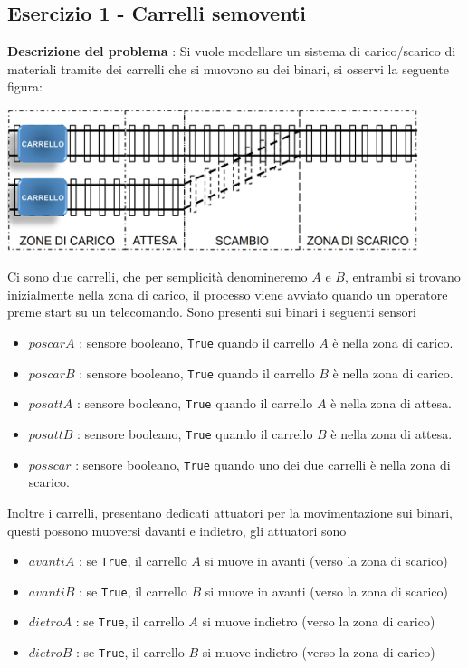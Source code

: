 \documentclass[10pt, letterpaper]{report}
\begin{document}
\subsection{Esercizio 1 - Carrelli semoventi}
\textbf{Descrizione del problema} : Si vuole modellare un sistema di carico/scarico di materiali tramite dei carrelli che si muovono su dei binari, si osservi la seguente figura:
\begin{center}
    \includegraphics[width=0.9\textwidth ]{images/carrelli.png}
\end{center}
Ci sono due carrelli, che per semplicità denomineremo $A$ e $B$, entrambi si trovano inizialmente nella zona di carico, il processo viene avviato quando un operatore preme start su un telecomando. Sono presenti sui binari i seguenti sensori\begin{itemize}
    \item \color{darkgreen}$poscarA$\color{black} : sensore booleano, \texttt{True} quando il carrello $A$ è nella zona di carico.
    \item \color{darkgreen}$poscarB$\color{black} : sensore booleano, \texttt{True} quando il carrello $B$ è nella zona di carico.
    \item \color{darkgreen}$posattA$\color{black} : sensore booleano, \texttt{True} quando il carrello $A$ è nella zona di attesa.
    \item \color{darkgreen}$posattB$\color{black} : sensore booleano, \texttt{True} quando il carrello $B$ è nella zona di attesa.
    \item \color{darkgreen}$posscar$\color{black} : sensore booleano, \texttt{True} quando uno dei due carrelli è nella zona di scarico.
\end{itemize}
Inoltre i carrelli, presentano dedicati attuatori per la movimentazione sui binari, questi possono muoversi davanti e indietro, gli attuatori sono\begin{itemize}
    \item \color{gray}$avantiA$\color{black} : se \texttt{True}, il carrello $A$ si muove in avanti (verso la zona di scarico) 
    \item \color{gray}$avantiB$\color{black} : se \texttt{True}, il carrello $B$ si muove in avanti (verso la zona di scarico) 
    \item \color{gray}$dietroA$\color{black} : se \texttt{True}, il carrello $A$ si muove indietro (verso la zona di carico) 
    \item \color{gray}$dietroB$\color{black} : se \texttt{True}, il carrello $B$ si muove indietro (verso la zona di carico)
\end{itemize}
\end{document}
